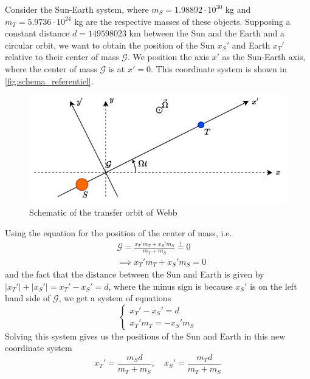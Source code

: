 Consider the Sun-Earth system, where \(m_S = 1.98892 \cdot 10^{30}\) kg and \(m_T = 5.9736 \cdot 10^{24}\) kg are the respective masses of these objects. Supposing a constant distance \(d = 149598023\) km between the Sun and the Earth and a circular orbit, we want to obtain the position of the Sun \(x_S'\) and Earth \(x_T'\) relative to their center of mass \(\mathcal G\). We position the axis \(x'\) as the Sun-Earth axis, where the center of mass \(\mathcal G\) is at \(x'=0\). This coordinate system is shown in \autoref{fig:schema_referentiel}.
\begin{figure}[h]
    \centering
    \includegraphics[width=0.8\linewidth]{figures/referentiel.pdf}
    \caption{Schematic of the transfer orbit of Webb}
    \label{fig:schema_referentiel}
\end{figure}
Using the equation for the position of the center of mass, i.e.
\begin{equation}
    \begin{aligned}
        &\mathcal G = \frac{x_T' m_T + x_S' m_S}{m_T + m_S} \stackrel{!}{=} 0 \\
        &\implies x_T' m_T + x_S' m_S = 0
    \end{aligned}
\end{equation}
and the fact that the distance between the Sun and Earth is given by \(|x_T'|+|x_S'| = x_T' - x_S' = d\), where the minus sign is because \(x_S'\) is on the left hand side of \(\mathcal G\), we get a system of equations
\begin{equation}
    \begin{cases}
        x_T' - x_S' = d \\
        x_T' m_T = -x_S' m_S
    \end{cases}
\end{equation}
Solving this system gives us the positions of the Sun and Earth in this new coordinate system
\begin{equation}
    x_T' = \frac{m_S d}{m_T + m_S}, \quad x_S' = \frac{m_T d}{m_T + m_S}
\end{equation}


